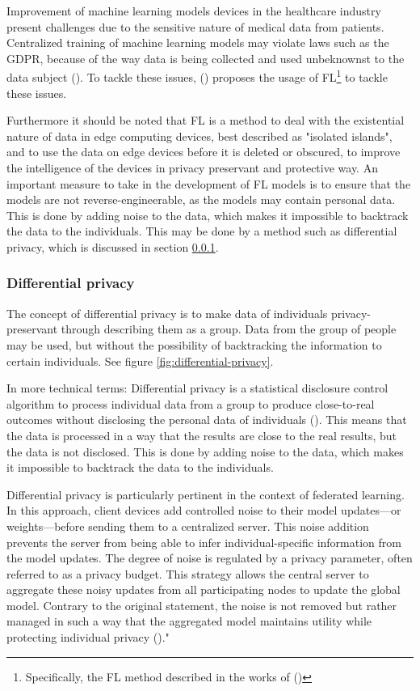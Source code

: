 Improvement of machine learning models devices in the healthcare industry present challenges due to the sensitive nature of medical data from patients. Centralized training of machine learning models may violate laws such as the GDPR, because of the way data is being collected and used unbeknownst to the data subject (\cite{an2022federatedlearninghealthcare}). To tackle these issues, \citeauthor{an2022federatedlearninghealthcare} (\citeyear{an2022federatedlearninghealthcare}) proposes the usage of FL\footnote{Specifically, the FL method described in the works of \citeauthor{ya2019federatedMLconcepts}(\citeyear{ya2019federatedMLconcepts})} to tackle these issues.

Furthermore it should be noted that FL is a method to deal with the existential nature of data in edge computing devices, best described as "isolated islands", and to use the data on edge devices before it is deleted or obscured, to improve the intelligence of the devices in privacy preservant and protective way. An important measure to take in the development of FL models is to ensure that the models are not reverse-engineerable, as the models may contain personal data. This is done by adding noise to the data, which makes it impossible to backtrack the data to the individuals. This may be done by a method such as differential privacy, which is discussed in section \ref{sec:differential-privacy}.

\subsubsection{Differential privacy}
\label{sec:differential-privacy}
The concept of differential privacy is to make data of individuals privacy-preservant through describing them as a group. Data from the group of people may be used, but without the possibility of backtracking the information to certain individuals. See figure \ref{fig:differential-privacy}.

In more technical terms: Differential privacy is a statistical disclosure control algorithm to process individual data from a group to produce close-to-real outcomes without disclosing the personal data of individuals (\cite{hu2023metaverse-privacy}). This means that the data is processed in a way that the results are close to the real results, but the data is not disclosed. This is done by adding noise to the data, which makes it impossible to backtrack the data to the individuals.

Differential privacy is particularly pertinent in the context of federated learning. In this approach, client devices add controlled noise to their model updates—or weights—before sending them to a centralized server. This noise addition prevents the server from being able to infer individual-specific information from the model updates. The degree of noise is regulated by a privacy parameter, often referred to as a privacy budget. This strategy allows the central server to aggregate these noisy updates from all participating nodes to update the global model. Contrary to the original statement, the noise is not removed but rather managed in such a way that the aggregated model maintains utility while protecting individual privacy (\cite{sh2023RolwOfWeightTransmissionProtocolinML})."

